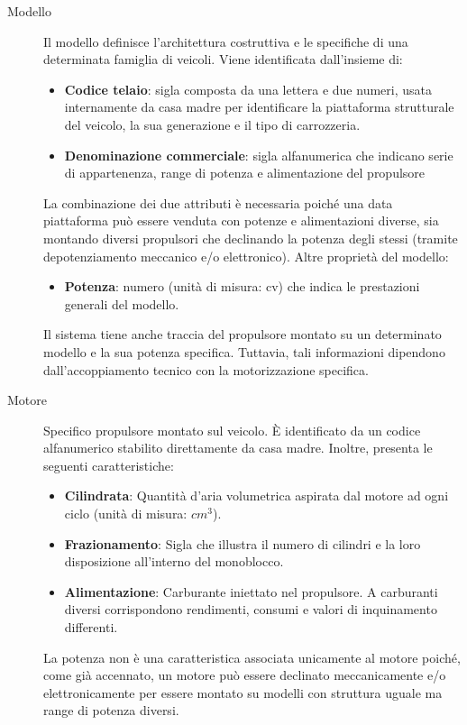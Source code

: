 \begin{description}
    \item[Modello] Il modello definisce l'architettura costruttiva e le specifiche
    di una determinata famiglia di veicoli. Viene identificata dall'insieme di:
    \begin{itemize}
        \item \textbf{Codice telaio}: sigla composta da una lettera e due numeri, usata
        internamente da casa madre per identificare la piattaforma strutturale del
        veicolo, la sua generazione e il tipo di carrozzeria.
        \item \textbf{Denominazione commerciale}: sigla alfanumerica che
        indicano serie di appartenenza, range di potenza e alimentazione del propulsore
    \end{itemize}
    La combinazione dei due attributi è necessaria poiché una data piattaforma può
    essere venduta con potenze e alimentazioni diverse, sia montando
    diversi propulsori che declinando la potenza degli stessi
    (tramite depotenziamento meccanico e/o elettronico). Altre proprietà del modello:
    \begin{itemize}
        \item \textbf{Potenza}: numero (unità di misura: cv) che indica le 
        prestazioni generali del modello.
    \end{itemize}
    Il sistema tiene anche traccia del propulsore montato su un determinato modello
    e la sua potenza specifica. Tuttavia, tali informazioni dipendono dall'accoppiamento
    tecnico con la motorizzazione specifica.

    \item[Motore] Specifico propulsore montato sul veicolo.
    È identificato da un codice alfanumerico stabilito direttamente da casa madre.
    Inoltre, presenta le seguenti caratteristiche:
    \begin{itemize}
        \item \textbf{Cilindrata}: Quantità d'aria volumetrica aspirata dal motore
        ad ogni ciclo (unità di misura: $cm^3$).
        \item \textbf{Frazionamento}: Sigla che illustra il numero di cilindri e la
        loro disposizione all'interno del monoblocco.
        \item \textbf{Alimentazione}: Carburante iniettato nel propulsore. A carburanti
        diversi corrispondono rendimenti, consumi e valori di inquinamento differenti.
    \end{itemize}
    La potenza non è una caratteristica associata unicamente al motore poiché,
    come già accennato, un motore può essere declinato meccanicamente e/o
    elettronicamente per essere montato su modelli con struttura uguale
    ma range di potenza diversi.


\end{description}
